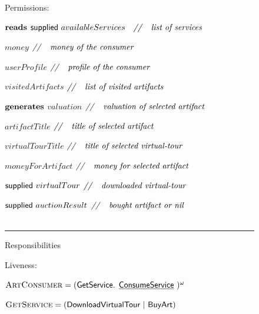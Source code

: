 \documentclass[paper=letter, fontsize=12pt]{article}
\begin{document}
\begin{figure}[H]
\begin{center}
{{\setlength\parindent{14pt} Permissions: 
\par\setlength\parindent{104pt}$\text{\textbf{reads}}$ \hspace{2.8em} $\text{{\fontfamily{\sfdefault}\selectfont supplied }}availableServices \quad \text{\textit{//}} \quad \text{\textit{list of services}}$
\par\setlength\parindent{162pt}$money$\hspace{8.9em} $\text{\textit{//}} \quad \text{\textit{money of the consumer}}$
\par\setlength\parindent{162pt}$userProfile$\hspace{6.6em} $\text{\textit{//}} \quad \text{\textit{profile of the consumer}}$
\par\setlength\parindent{162pt}$visitedArtifacts$\hspace{4.5em} $\text{\textit{//}} \quad \text{\textit{list of visited artifacts}}$
\par\setlength\parindent{104pt}$\text{\textbf{generates}}$ \hspace{0.9em} $valuation$\hspace{7.5em} $\text{\textit{//}} \quad \text{\textit{valuation of selected artifact}}$
\par\setlength\parindent{162pt}$artifactTitle$\hspace{6.1em} $\text{\textit{//}} \quad \text{\textit{title of selected artifact}}$\
\par\setlength\parindent{162pt}$virtualTourTitle$\hspace{4.4em} $\text{\textit{//}} \quad \text{\textit{title of selected virtual-tour}}$\
\par\setlength\parindent{162pt}$moneyForArtifact$\hspace{3.4em} $\text{\textit{//}} \quad \text{\textit{money for selected artifact}}$
\par\setlength\parindent{162pt}$\text{{\fontfamily{\sfdefault}\selectfont supplied }}virtualTour$\hspace{2.5em} $\text{\textit{//}} \quad \text{\textit{downloaded virtual-tour}}$
\par\setlength\parindent{162pt}$\text{{\fontfamily{\sfdefault}\selectfont supplied }}auctionResult$\hspace{1.4em} $\text{\textit{//}} \quad \text{\textit{bought artifact or nil}}$
\\
\\
\setlength\parindent{14pt} \noindent\rule{15cm}{0.4pt}

\setlength\parindent{14pt} Responsibilities
\par \setlength\parindent{14pt} Liveness:
\par\setlength\parindent{75pt}$\text{\textsc{ArtConsumer}} = (\text{{\fontfamily{\sfdefault}\selectfont 
GetService. \underline{ConsumeService}
}})^{\omega}$
\par\setlength\parindent{75pt}$\text{\textsc{GetService}} = (\text{{\fontfamily{\sfdefault}\selectfont 
DownloadVirtualTour |  BuyArt}})$

}}
\end{center}
\end{figure}
\end{document}
